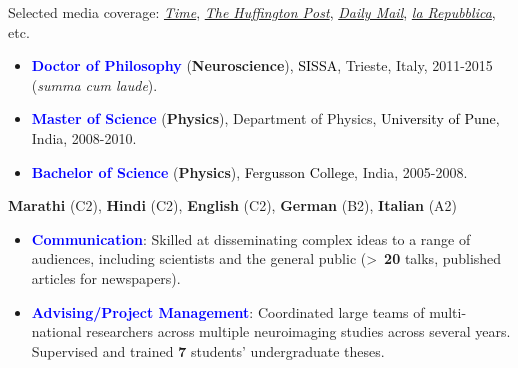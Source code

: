\documentclass[10pt]{article}
\begin{document}
	Selected media coverage: \href{http://time.com/3242/driving-over-your-best-friend-its-the-right-thing-to-do/}{\textit{Time}}, \href{http://www.huffingtonpost.com/entry/autism-empathy-brain-research_us_56f92575e4b014d3fe237413}{\textit{The Huffington Post}}, \href{http://www.dailymail.co.uk/sciencetech/article-4308284/Virtual-reality-experiment-puts-altruism-test.html}{\textit{Daily Mail}}, \href{http://www.repubblica.it/scienze/2017/04/11/news/area_cervello_perdono-162669836/?rss}{\textit{la Repubblica}}, etc.

	
	\begin{itemize}	
	
	\itemsep-0.1em
	\item \textbf{\textcolor{blue}{Doctor of Philosophy}} (\textbf{Neuroscience}), \textcolor{black}{SISSA}, Trieste, Italy, 2011-2015 (\textit{summa cum laude}).

	\item \textbf{\textcolor{blue}{Master of Science}} (\textbf{Physics}), Department of Physics, \textcolor{black}{University of Pune}, India, 2008-2010.%
	
	\item \textbf{\textcolor{blue}{Bachelor of Science}} (\textbf{Physics}), \textcolor{black}{Fergusson College}, India, 2005-2008.%

    \end{itemize}

	\textbf{Marathi} (C2), \textbf{Hindi} (C2), \textbf{English} (C2), \textbf{German} (B2), \textbf{Italian} (A2)
	

	\begin{itemize}	
		
	\item \textcolor{blue}{\textbf{Communication}}: Skilled	at	disseminating complex ideas to a range of audiences, including scientists and the general public (\textgreater ~\textbf{20} talks, published articles for newspapers).	
	
	\item \textcolor{blue}{\textbf{Advising/Project Management}}: Coordinated large teams of multi-national researchers across multiple neuroimaging studies across several years. Supervised and trained \textbf{7} students' undergraduate theses.
	
     \end{itemize}	
	
	
\end{document}
